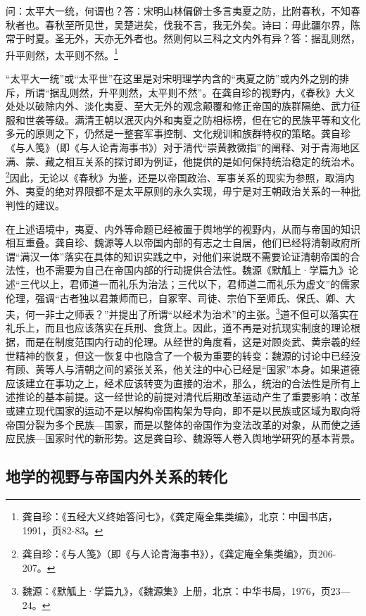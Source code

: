 \documentclass[a4paper, 12pt, openright]{ctexbook}
\renewenvironment{quote}
  {\list{}{\rightmargin2\ccwd \leftmargin2\ccwd \itemindent=2\ccwd \listparindent=2\ccwd}%
   \item\relax\small\kaishu\color{black}}
  {\endlist}
\begin{document}
\begin{quote}
问：太平大一统，何谓也？答：宋明山林偏僻士多言夷夏之防，比附春秋，不知春秋者也。春秋至所见世，吴楚进矣，伐我不言，我无外矣。诗曰：毋此疆尔界，陈常于时夏。圣无外，天亦无外者也。然则何以三科之文内外有异？答：据乱则然，升平则然，太平则不然。\footnote{龚自珍：《五经大义终始答问七》，《龚定庵全集类编》，北京：中国书店，1991，页82-83。}
\end{quote}

“太平大一统”或“太平世”在这里是对宋明理学内含的“夷夏之防”或内外之别的排斥，所谓“据乱则然，升平则然，太平则不然”。在龚自珍的视野内，《春秋》大义处处以破除内外、淡化夷夏、至大无外的观念颠覆和修正帝国的族群隔绝、武力征服和世袭等级。满清王朝以泯灭内外和夷夏之防相标榜，但在它的民族平等和文化多元的原则之下，仍然是一整套军事控制、文化规训和族群特权的策略。龚自珍《与人笺》（即《与人论青海事书》）对于清代“崇黄教微指”的阐释、对于青海地区满、蒙、藏之相互关系的探讨即为例证，他提供的是如何保持统治稳定的统治术。\footnote{龚自珍：《与人笺》（即《与人论青海事书》），《龚定庵全集类编》，页206-207。}因此，无论以《春秋》为鉴，还是以帝国政治、军事关系的现实为参照，取消内外、夷夏的绝对界限都不是太平原则的永久实现，毋宁是对王朝政治关系的一种批判性的建议。

在上述语境中，夷夏、内外等命题已经被置于舆地学的视野内，从而与帝国的知识相互重叠。龚自珍、魏源等人以帝国内部的有志之士自居，他们已经将清朝政府所谓“满汉一体”落实在具体的知识实践之中，对他们来说既不需要论证清朝帝国的合法性，也不需要为自己在帝国内部的行动提供合法性。魏源《默觚上·学篇九》论述“三代以上，君师道一而礼乐为治法；三代以下，君师道二而礼乐为虚文”的儒家伦理，强调“古者独以君兼师而已，自冢宰、司徒、宗伯下至师氏、保氏、卿、大夫，何一非士之师表？”并提出了所谓“以经术为治术”的主张。\footnote{魏源：《默觚上·学篇九》，《魏源集》上册，北京：中华书局，1976，页23—24。}道不但可以落实在礼乐上，而且也应该落实在兵刑、食货上。因此，道不再是对抗现实制度的理论根据，而是在制度范围内行动的伦理。从经世的角度看，这是对顾炎武、黄宗羲的经世精神的恢复，但这一恢复中也隐含了一个极为重要的转变：魏源的讨论中已经没有顾、黄等人与清朝之间的紧张关系，他关注的中心已经是“国家”本身。如果道德应该建立在事功之上，经术应该转变为直接的治术，那么，统治的合法性是所有上述推论的基本前提。这一经世论的前提对清代后期改革运动产生了重要影响：改革或建立现代国家的运动不是以解构帝国构架为导向，即不是以民族或区域为取向将帝国分裂为多个民族—国家，而是以整体的帝国作为变法改革的对象，从而使之适应民族—国家时代的新形势。这是龚自珍、魏源等人卷入舆地学研究的基本背景。

\subsection{地学的视野与帝国内外关系的转化}
\end{document}

